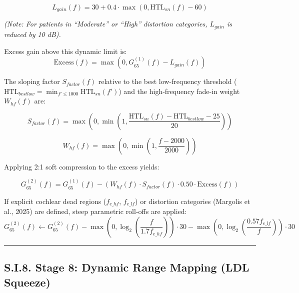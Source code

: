 \documentclass[
  12pt,
]{article}
\begin{document}
\begin{equation}
L_{gain}(f) = 30 + 0.4 \cdot \max\left(0, \text{HTL}_{sn}(f) - 60\right)
\end{equation}

\emph{(Note: For patients in ``Moderate'' or ``High'' distortion
categories, \(L_{gain}\) is reduced by 10 dB).}

Excess gain above this dynamic limit is: \begin{equation}
\text{Excess}(f) = \max\left(0, G_{65}^{(1)}(f) - L_{gain}(f)\right)
\end{equation}

The sloping factor \(S_{factor}(f)\) relative to the best low-frequency
threshold
(\(\text{HTL}_{bestlow} = \min_{f' \le 1000} \text{HTL}_{sn}(f')\)) and
the high-frequency fade-in weight \(W_{hf}(f)\) are:

\begin{equation}
S_{factor}(f) = \max\left(0, \min\left(1, \frac{\text{HTL}_{sn}(f) - \text{HTL}_{bestlow} - 25}{20}\right)\right)
\end{equation}

\begin{equation}
W_{hf}(f) = \max\left(0, \min\left(1, \frac{f - 2000}{2000}\right)\right)
\end{equation}

Applying 2:1 soft compression to the excess yields:

\begin{equation}
G_{65}^{(2)}(f) = G_{65}^{(1)}(f) - \left(W_{hf}(f) \cdot S_{factor}(f) \cdot 0.50 \cdot \text{Excess}(f)\right)
\end{equation}

If explicit cochlear dead regions (\(f_{e\_hf}\), \(f_{e\_lf}\)) or
distortion categories (Margolis et al., 2025) are defined, steep
parametric roll-offs are applied: \begin{equation}
G_{65}^{(2)}(f) \leftarrow G_{65}^{(2)}(f) - \max\left(0, \log_2\left(\frac{f}{1.7 f_{e\_hf}}\right)\right) \cdot 30 - \max\left(0, \log_2\left(\frac{0.57 f_{e\_lf}}{f}\right)\right) \cdot 30
\end{equation}

\begin{center}\rule{0.5\linewidth}{0.5pt}\end{center}

\subsection{S.I.8. Stage 8: Dynamic Range Mapping (LDL
Squeeze)}\label{s.i.8.-stage-8-dynamic-range-mapping-ldl-squeeze}
\end{document}
